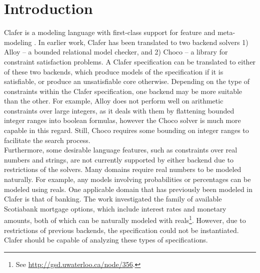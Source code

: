 \documentclass{easychair}
\begin{document}
\setcounter{tocdepth}{2}
{\small
\tableofcontents}

%
%

\pagestyle{empty}


\section{Introduction}
Clafer is a modeling language with first-class support for feature and meta-modeling \cite{BakClafer}. In earlier work, Clafer has been translated to two backend solvers 1) Alloy -- a bounded relational model checker, and 2) Choco -- a library for constraint satisfaction problems. A Clafer specification can be translated to either of these two backends, which produce models of the specification if it is satisfiable, or produce an unsatisfiable core otherwise. Depending on the type of constraints within the Clafer specification, one backend may be more suitable than the other. For example, Alloy does not perform well on arithmetic constraints over large integers, as it deals with them by flattening bounded integer ranges into boolean formulas, however the Choco solver is much more capable in this regard. Still, Choco requires some bounding on integer ranges to facilitate the search process.\\
\indent Furthermore, some desirable language features, such as constraints over real numbers and strings, are not currently supported by either backend due to restrictions of the solvers. Many domains require real numbers to be modeled naturally. For example, any models involving probabilities or percentages can be modeled using reals. One applicable domain that has previously been modeled in Clafer is that of banking. The work investigated the family of available Scotiabank mortgage options, which include interest rates and monetary amounts, both of which can be naturally modeled with reals\footnote{See \url{http://gsd.uwaterloo.ca/node/356}.}. However, due to restrictions of previous backends, the specification could not be instantiated. Clafer should be capable of analyzing these types of specifications. \\
\end{document}
